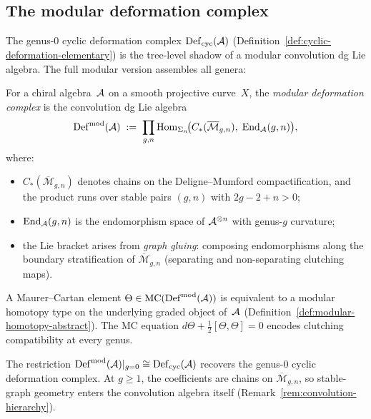 \subsection{The modular deformation complex}
\label{subsec:modular-deformation-complex}

The genus-$0$ cyclic deformation complex
$\operatorname{Def}_{\mathrm{cyc}}(\mathcal{A})$ (Definition~\ref{def:cyclic-deformation-elementary})
is the tree-level shadow of a modular convolution dg Lie algebra.
The full modular version assembles all genera:

\begin{definition}
\label{def:modular-deformation-complex}
For a chiral algebra~$\mathcal{A}$ on a smooth projective curve~$X$, the
\emph{modular deformation complex} is the convolution dg Lie algebra
\begin{equation}\label{eq:modular-deformation-complex}
\operatorname{Def}^{\mathrm{mod}}(\mathcal{A})
\;:=\;
\prod_{g,n}
\operatorname{Hom}_{\Sigma_n}\!\bigl(
  C_*(\overline{\mathcal{M}}_{g,n}),\;
  \operatorname{End}_{\mathcal{A}}(g,n)
\bigr),
\end{equation}
where:
\begin{itemize}
\item $C_*(\overline{\mathcal{M}}_{g,n})$ denotes chains on the
  Deligne--Mumford compactification, and the product runs over
  stable pairs $(g,n)$ with $2g - 2 + n > 0$;
\item $\operatorname{End}_{\mathcal{A}}(g,n)$ is the endomorphism space of
  $\mathcal{A}^{\otimes n}$ with genus-$g$ curvature;
\item the Lie bracket arises from \emph{graph gluing}: composing
  endomorphisms along the boundary stratification of
  $\overline{\mathcal{M}}_{g,n}$ (separating and non-separating
  clutching maps).
\end{itemize}
A Maurer--Cartan element
$\Theta \in
\operatorname{MC}(\operatorname{Def}^{\mathrm{mod}}(\mathcal{A}))$ is
equivalent to a modular homotopy type on the underlying graded
object of~$\mathcal{A}$
(Definition~\ref{def:modular-homotopy-abstract}).
The MC equation
$d\Theta + \frac{1}{2}[\Theta,\Theta] = 0$
encodes clutching compatibility at every genus.
\end{definition}

\begin{remark}
\label{rem:modular-vs-cyclic-complex}
The restriction $\operatorname{Def}^{\mathrm{mod}}(\mathcal{A})|_{g=0}
\cong \operatorname{Def}_{\mathrm{cyc}}(\mathcal{A})$ recovers the genus-$0$ cyclic deformation
complex.  At $g \geq 1$, the coefficients are
chains on $\overline{\mathcal{M}}_{g,n}$, so stable-graph geometry
enters the convolution algebra itself
(Remark~\ref{rem:convolution-hierarchy}).
\end{remark}

